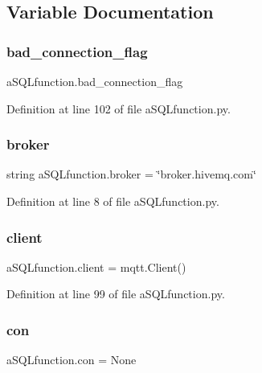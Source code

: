 \subsection{Variable Documentation}
\mbox{\label{namespacea_s_q_lfunction_a5609027c55d514971243f61aa16b7d11}} 
\subsubsection{bad\+\_\+connection\+\_\+flag}
{\footnotesize\ttfamily a\+S\+Q\+Lfunction.\+bad\+\_\+connection\+\_\+flag}



Definition at line 102 of file a\+S\+Q\+Lfunction.\+py.

\mbox{\label{namespacea_s_q_lfunction_ad2759b313d097ec4924585b1a0b46129}} 
\subsubsection{broker}
{\footnotesize\ttfamily string a\+S\+Q\+Lfunction.\+broker = \char`\"{}broker.\+hivemq.\+com\char`\"{}}



Definition at line 8 of file a\+S\+Q\+Lfunction.\+py.

\mbox{\label{namespacea_s_q_lfunction_aae08a8e774667d74ca036f82b3636dbf}} 
\subsubsection{client}
{\footnotesize\ttfamily a\+S\+Q\+Lfunction.\+client = mqtt.\+Client()}



Definition at line 99 of file a\+S\+Q\+Lfunction.\+py.

\mbox{\label{namespacea_s_q_lfunction_a6ea718b8577dc5b2f11c22829e3b4329}} 
\subsubsection{con}
{\footnotesize\ttfamily a\+S\+Q\+Lfunction.\+con = None}



